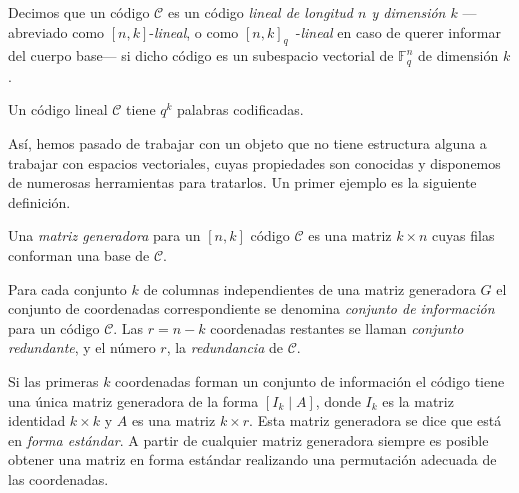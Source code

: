 
\begin{definition}
  Decimos que un código \(\mathcal C\) es un código \textit{lineal de longitud \(n\) y dimensión \(k\)} —abreviado como \([n, k]\)-\textit{lineal}, o como \([n, k]_q\)~-\textit{lineal} en caso de querer informar del cuerpo base— si dicho código es un subespacio vectorial de \(\mathbb F_q^n\) de dimensión \(k\).
\end{definition}


\begin{remark}
  Un código lineal \(\mathcal C\) tiene \(q^k\) palabras codificadas.
\end{remark}

Así, hemos pasado de trabajar con un objeto que no tiene estructura alguna a trabajar con espacios vectoriales, cuyas propiedades son conocidas y disponemos de numerosas herramientas para tratarlos.
Un primer ejemplo es la siguiente definición.

\begin{definition}
  Una \textit{matriz generadora} para un \([n, k]\) código \(\mathcal C\) es una matriz \(k \times n\) cuyas filas conforman una base de \(\mathcal C\).
\end{definition}

\begin{definition}
  Para cada conjunto \(k\) de columnas independientes de una matriz generadora \(G\) el conjunto de coordenadas correspondiente se denomina \textit{conjunto de información} para un código \(\mathcal C\). 
  Las \(r = n - k\) coordenadas restantes se llaman \textit{conjunto redundante}, y el número \(r\), la \textit{redundancia} de \(\mathcal C\).
\end{definition}

Si las primeras \(k\) coordenadas forman un conjunto de información el código tiene una única matriz generadora de la forma \([I_k \mid A]\), donde \(I_k\) es la matriz identidad \(k \times k\) y \(A\) es una matriz \(k \times r\). 
Esta matriz generadora se dice que está en \textit{forma estándar}.
A partir de cualquier matriz generadora siempre es posible obtener una matriz en forma estándar realizando una permutación adecuada de las coordenadas.


